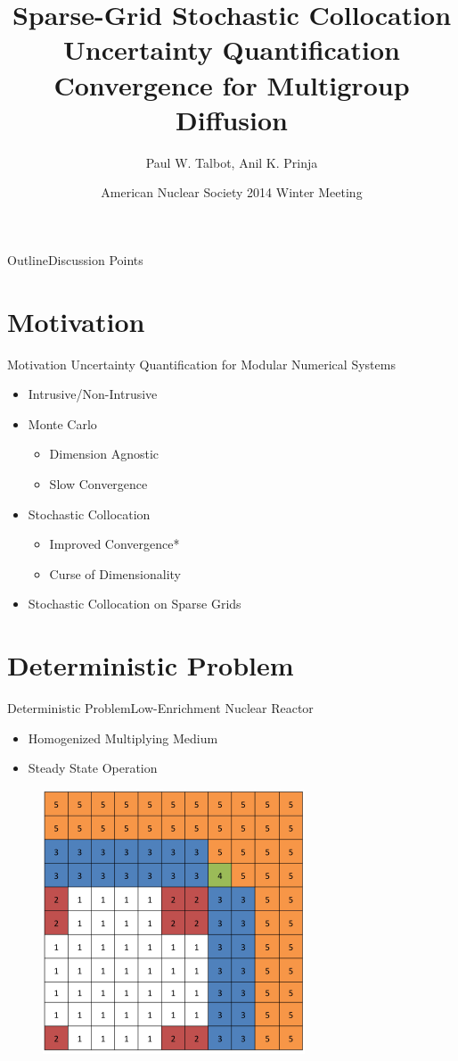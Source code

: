 \documentclass{beamer}
\title[SC UQ for Multigroup Neutron Diffusion] %
{Sparse-Grid Stochastic Collocation Uncertainty Quantification Convergence for Multigroup Diffusion}
\author[Talbot] %
{Paul W. Talbot\inst{1}, Anil K. Prinja\inst{1}}
\institute[University of New Mexico] %
{
  \inst{1}%
  University of New Mexico\\
   \vspace{10pt}
\footnotesize{Supported by Idaho National Laboratory}
}
\date[ANS Winter, 2014] %
{American Nuclear Society 2014 Winter Meeting}
\begin{document}
\begin{frame}
  \titlepage
\end{frame}

\begin{frame}{Outline}{Discussion Points}\vspace{-20pt}
  \tableofcontents%
\end{frame}

\section{Motivation}
\begin{frame}{Motivation}\vspace{-30pt}
Uncertainty Quantification for Modular Numerical Systems\vspace{5pt}
\begin{itemize}
  \item Intrusive/Non-Intrusive\vspace{5pt}
  \item Monte Carlo
  \begin{itemize}
    \item Dimension Agnostic
    \item Slow Convergence
  \end{itemize}\vspace{5pt}
  \item Stochastic Collocation
  \begin{itemize}
    \item Improved Convergence*
    \item Curse of Dimensionality
  \end{itemize}\vspace{5pt}
  \item Stochastic Collocation on Sparse Grids
\end{itemize}
\end{frame}

\section{Deterministic Problem}
\begin{frame}{Deterministic Problem}{Low-Enrichment Nuclear Reactor}
\begin{itemize}
\item Homogenized Multiplying Medium
\item Steady State Operation
\end{itemize}
\begin{figure}
  \includegraphics[width=0.4\linewidth]{../graphics/core}
\end{figure}
\end{frame}
\end{document}
